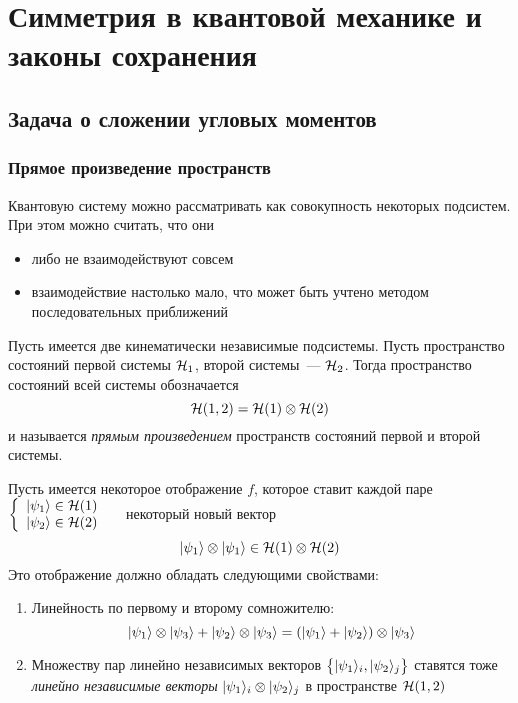 \setcounter{chapter}{8}

\chapter{Симметрия в квантовой механике и законы сохранения}

\setcounter{section}{9}

\section{Задача о сложении угловых моментов}

\subsection{Прямое произведение пространств}

Квантовую систему можно рассматривать как совокупность некоторых подсистем. При этом можно считать, что они
\begin{itemize}
  \item либо не взаимодействуют совсем
  \item взаимодействие настолько мало, что может быть учтено методом последовательных приближений
\end{itemize}



\Def Пусть имеется две кинематически независимые подсистемы. Пусть пространство состояний первой системы $\mathcal H_1$, второй системы~--- $\mathcal H_2$. Тогда пространство состояний всей системы обозначается
$$
    \mathcal H(1,2) = \mathcal H(1) \otimes \mathcal H(2)
$$
и называется \emph{прямым произведением} пространств состояний первой и второй системы.

Пусть имеется некоторое отображение $f$, которое ставит каждой паре
$
\left\{
  \begin{array}{ll}
    | \psi_1 \rangle \in \mathcal H(1) & \hbox{} \\
    | \psi_2 \rangle \in \mathcal H(2) & \hbox{}
  \end{array}
\right.
$
некоторый новый вектор
$$
    | \psi_1 \rangle \otimes | \psi_1 \rangle \in \mathcal H(1) \otimes \mathcal H(2)
$$
\def \ot{\otimes}
Это отображение должно обладать следующими свойствами:
\begin{enumerate}
  \item Линейность по первому и второму сомножителю:
  $$
    \qu{\psi_1} \ot \qu{\psi_3} + \qu{\psi_2} \ot \qu{\psi_3} = (\qu{\psi_1} + \qu{\psi_2}) \ot \qu{\psi_3}
  $$
  \item Множеству пар линейно независимых векторов $\big\{ | \psi_1 \rangle_i, | \psi_2 \rangle_j \big\}$ ставятся тоже \emph{линейно независимые векторы} $\qu{\psi_1}_i \ot \qu{\psi_2}_j$ в пространстве $\mathcal H(1,2)$
\end{enumerate}

